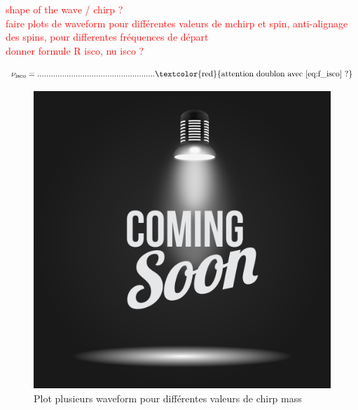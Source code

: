 \textcolor{red}{shape of the wave / chirp ?}\\

\textcolor{red}{faire plots de waveform pour différentes valeurs de mchirp et spin, anti-alignage des spins, pour differentes fréquences de départ}\\

\textcolor{red}{donner formule R isco, nu isco ?}

\begin{equation}
  \nu_{\text{isco}} = ....................................................
  \text{\textcolor{red}{attention doublon avec \ref{eq:f_isco} ?}}
  \label{eq:nu_isco}
\end{equation}

\begin{figure}
  \centering
  \begin{minipage}{0.45\linewidth}
    \includegraphics[width=\linewidth]{placeholder.png}
    \caption{Plot plusieurs waveform pour différentes valeurs de chirp mass}
    \label{fig:waveform_mchirp}
  \end{minipage}
  \hfill
  \begin{minipage}{0.45\linewidth}

\end{minipage}
\end{figure}
